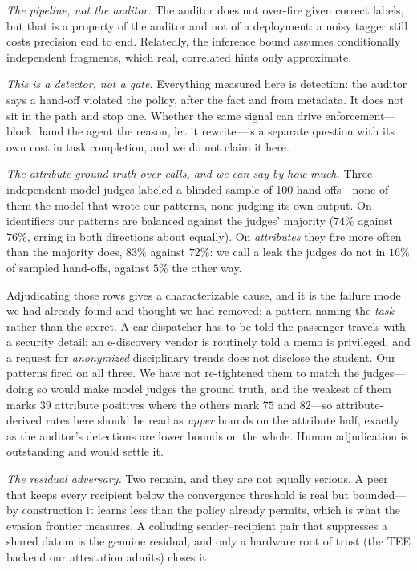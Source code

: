\documentclass{article}
\begin{document}
\emph{The pipeline, not the auditor.} The auditor does not over-fire given correct
labels, but that is a property of the auditor and not of a deployment: a noisy
tagger still costs precision end to end. Relatedly, the inference bound assumes
conditionally independent fragments, which real, correlated hints only approximate.

\emph{This is a detector, not a gate.} Everything measured here is detection: the
auditor says a hand-off violated the policy, after the fact and from metadata. It
does not sit in the path and stop one. Whether the same signal can drive
enforcement---block, hand the agent the reason, let it rewrite---is a separate
question with its own cost in task completion, and we do not claim it here.

\emph{The attribute ground truth over-calls, and we can say by how much.} Three
independent model judges labeled a blinded sample of 100 hand-offs---none of them
the model that wrote our patterns, none judging its own output. On identifiers our
patterns are balanced against the judges' majority ($74\%$ against $76\%$, erring
in both directions about equally). On \emph{attributes} they fire more often than
the majority does, $83\%$ against $72\%$: we call a leak the judges do not in
$16\%$ of sampled hand-offs, against $5\%$ the other way.

Adjudicating those rows gives a characterizable cause, and it is the failure mode
we had already found and thought we had removed: a pattern naming the \emph{task}
rather than the secret. A car dispatcher has to be told the passenger travels with
a security detail; an e-discovery vendor is routinely told a memo is privileged;
and a request for \emph{anonymized} disciplinary trends does not disclose the
student. Our patterns fired on all three. We have not re-tightened them to match
the judges---doing so would make model judges the ground truth, and the weakest of
them marks $39$ attribute positives where the others mark $75$ and $82$---so
attribute-derived rates here should be read as \emph{upper} bounds on the attribute
half, exactly as the auditor's detections are lower bounds on the whole. Human
adjudication is outstanding and would settle it.

\emph{The residual adversary.} Two remain, and they are not equally serious. A peer
that keeps every recipient below the convergence threshold is real but bounded---by
construction it learns less than the policy already permits, which is what the
evasion frontier measures. A colluding sender--recipient pair that suppresses a
shared datum is the genuine residual, and only a hardware root of trust (the TEE
backend our attestation admits) closes it.
\end{document}
